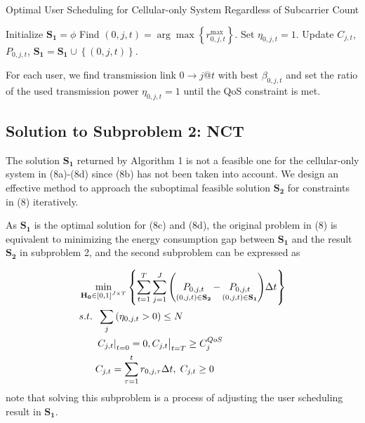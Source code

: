 \documentclass{ieeeaccess}
\begin{document}
\begin{algorithm}[h]
\caption{Optimal User Scheduling for Cellular-only System Regardless of Subcarrier Count}
\label{alg:1}
\begin{algorithmic}[1]
\STATE Initialize ${{\mathbf{S}}_{\mathbf{1}}}=\phi$
    \STATE Find $\left( {0,j,t} \right) = \arg \max \left\{ {r_{0,j,t}^{\max }} \right\}$.
    \STATE Set ${\eta _{0,j,t}} = 1$.
    \STATE Update ${C_{j,t}}$, ${P_{0,j,t}}$, ${{\mathbf{S}}_{\mathbf{1}}}={{\mathbf{S}}_{\mathbf{1}}} \cup \left\{ {\left( {0,j,t} \right)} \right\}$.
  \ENDWHILE
\ENDFOR
\end{algorithmic}
\end{algorithm}

For each user, we find transmission link $0 \to j@t$ with best ${\beta _{0,j,t}}$ and set the ratio of the used transmission power ${\eta _{0,j,t} = 1}$ until the QoS constraint is met.


\subsection{Solution to \textbf{Subproblem 2: NCT}}

The solution ${{\mathbf{S}}_{\mathbf{1}}}$ returned by Algorithm 1 is not a feasible one for the cellular-only system in (8a)-(8d) since (8b) has not been taken into account. We design an effective method to approach the suboptimal feasible solution ${{\mathbf{S}}_{\mathbf{2}}}$ for constraints in (8) iteratively.

As ${{\mathbf{S}}_{\mathbf{1}}}$ is the optimal solution for (8c) and (8d), the original problem in (8) is equivalent to minimizing the energy consumption gap between ${{\mathbf{S}}_{\mathbf{1}}}$ and the result ${{\mathbf{S}}_{\mathbf{2}}}$ in subproblem 2, and the second subproblem can be expressed as

\begin{subequations}
\begin{align}
& \mathop {\min }\limits_{{{\mathbf{{\rm H}}}_{\mathbf{0}}} \in {{\left[ {0,1} \right]}^{J \times T}}} \left\{ {\sum\limits_{t = 1}^T {\sum\limits_{j = 1}^J {\left( {\mathop {{P_{0,j,t}}}\limits_{\left( {0,j,t} \right) \in {{\mathbf{S}}_{\mathbf{2}}}}  - \mathop {{P_{0,j,t}}}\limits_{\left( {0,j,t} \right) \in {{\mathbf{S}}_{\mathbf{1}}}} } \right)} \Delta t} } \right\} \\
& {s.t.} \;\; \sum\limits_j  {\left( {{\eta _{0,j,t}} > 0} \right)}  \le N \\
& \;\;\;\;\;\; {\left. {{{\left. {{C_{j,t}}} \right|}_{t = 0}} = 0, {C_{j,t}}} \right|_{t = T}} \ge C_j^{QoS} \\
& \;\;\;\;\;\; {C_{j,t}} = \sum\limits_{\tau  = 1}^t {{r_{0,j,\tau }}\Delta t} ,\; {C_{j,t}} \ge 0
\end{align}
\end{subequations}
note that solving this subproblem is a process of adjusting the user scheduling result in ${{\mathbf{S}}_{\mathbf{1}}}$.
\end{document}
